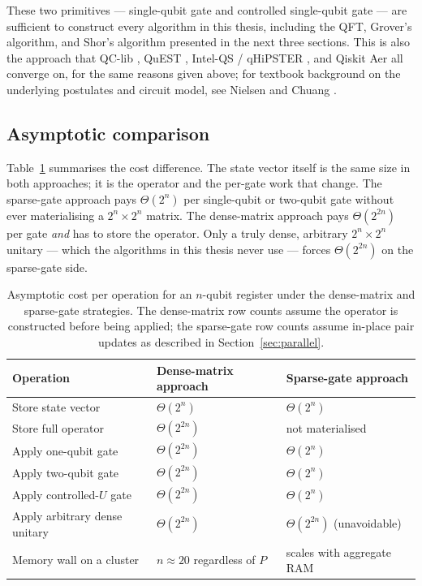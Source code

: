 These two primitives --- single-qubit gate and controlled single-qubit gate --- are sufficient to construct every algorithm in this thesis, including the QFT, Grover's algorithm, and Shor's algorithm presented in the next three sections. This is also the approach that QC-lib \cite{pgsq03}, QuEST \cite{quest2019}, Intel-QS / qHiPSTER \cite{smelyanskiy2016}, and Qiskit Aer \cite{qiskitaer2024} all converge on, for the same reasons given above; for textbook background on the underlying postulates and circuit model, see Nielsen and Chuang \cite{nielsenchuang2010}.

\subsection{Asymptotic comparison}

Table~\ref{tab:dense-vs-sparse} summarises the cost difference. The state vector itself is the same size in both approaches; it is the operator and the per-gate work that change. The sparse-gate approach pays $\Theta(2^n)$ per single-qubit or two-qubit gate without ever materialising a $2^n \times 2^n$ matrix. The dense-matrix approach pays $\Theta(2^{2n})$ per gate \emph{and} has to store the operator. Only a truly dense, arbitrary $2^n \times 2^n$ unitary --- which the algorithms in this thesis never use --- forces $\Theta(2^{2n})$ on the sparse-gate side.

\begin{table}[h]
\centering
\begin{tabular}{lll}
\hline
\textbf{Operation} & \textbf{Dense-matrix approach} & \textbf{Sparse-gate approach} \\
\hline
Store state vector              & $\Theta(2^n)$  & $\Theta(2^n)$ \\
Store full operator             & $\Theta(2^{2n})$ & not materialised \\
Apply one-qubit gate            & $\Theta(2^{2n})$ & $\Theta(2^n)$ \\
Apply two-qubit gate            & $\Theta(2^{2n})$ & $\Theta(2^n)$ \\
Apply controlled-$U$ gate       & $\Theta(2^{2n})$ & $\Theta(2^n)$ \\
Apply arbitrary dense unitary   & $\Theta(2^{2n})$ & $\Theta(2^{2n})$ (unavoidable) \\
Memory wall on a cluster        & $n \approx 20$ regardless of $P$ & scales with aggregate RAM \\
\hline
\end{tabular}
\caption{Asymptotic cost per operation for an $n$-qubit register under the dense-matrix and sparse-gate strategies. The dense-matrix row counts assume the operator is constructed before being applied; the sparse-gate row counts assume in-place pair updates as described in Section~\ref{sec:parallel}.}
\label{tab:dense-vs-sparse}
\end{table}

